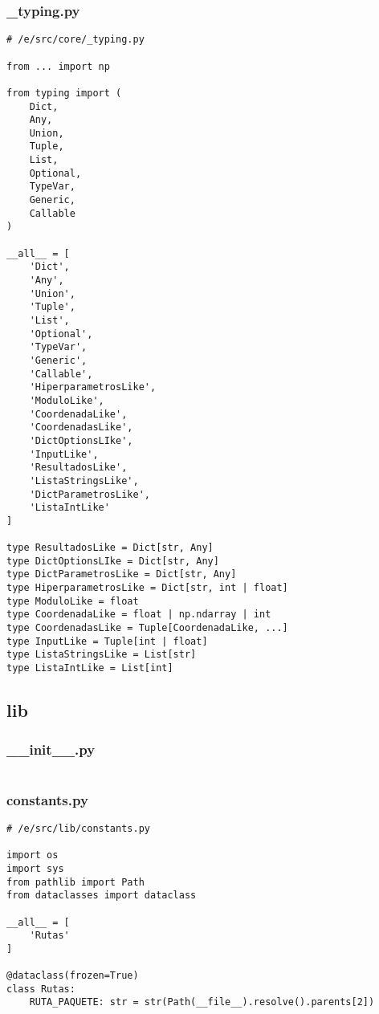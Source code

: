 \subsubsection{\_typing.py}
\begin{verbatim}
# /e/src/core/_typing.py

from ... import np

from typing import (
    Dict, 
    Any,
    Union,
    Tuple,
    List,
    Optional,
    TypeVar,
    Generic,
    Callable
)

__all__ = [
    'Dict', 
    'Any',
    'Union',
    'Tuple',
    'List',
    'Optional',
    'TypeVar',
    'Generic',
    'Callable',
    'HiperparametrosLike',
    'ModuloLike',
    'CoordenadaLike',
    'CoordenadasLike',
    'DictOptionsLIke',
    'InputLike',
    'ResultadosLike',
    'ListaStringsLike',
    'DictParametrosLike',
    'ListaIntLike'
]

type ResultadosLike = Dict[str, Any]
type DictOptionsLIke = Dict[str, Any]
type DictParametrosLike = Dict[str, Any]
type HiperparametrosLike = Dict[str, int | float]
type ModuloLike = float
type CoordenadaLike = float | np.ndarray | int
type CoordenadasLike = Tuple[CoordenadaLike, ...]
type InputLike = Tuple[int | float]
type ListaStringsLike = List[str]
type ListaIntLike = List[int]

\end{verbatim}


\subsection{lib}

\subsubsection{\_\_init\_\_.py}
\begin{verbatim}

\end{verbatim}


\subsubsection{constants.py}
\begin{verbatim}
# /e/src/lib/constants.py

import os
import sys
from pathlib import Path
from dataclasses import dataclass

__all__ = [
    'Rutas'
]

@dataclass(frozen=True)
class Rutas:
    RUTA_PAQUETE: str = str(Path(__file__).resolve().parents[2])
\end{verbatim}


